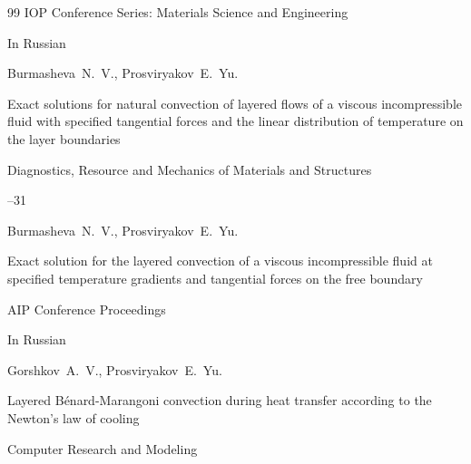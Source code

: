 \begin{thebibliography}{99}
\jour IOP Conference Series: Materials Science and Engineering





 




\lang In Russian

\by Burmasheva~N.~V.,  Prosviryakov~E.~Yu.

\paper Exact solutions for natural convection of layered flows of a viscous incompressible fluid with specified tangential forces and the linear distribution of temperature on the layer boundaries

\jour Diagnostics, Resource and Mechanics of Materials and Structures



--31





\by Burmasheva~N.~V.,  Prosviryakov~E.~Yu.

\paper Exact solution for the layered convection of a viscous incompressible fluid at specified temperature gradients and tangential forces on the free boundary

\jour AIP Conference Proceedings












\lang In Russian

\by Gorshkov~A.~V., Prosviryakov~E.~Yu.

\paper Layered B\'enard-Marangoni convection during heat transfer according to the Newton's law of cooling

\jour Computer Research and Modeling





\end{thebibliography}
